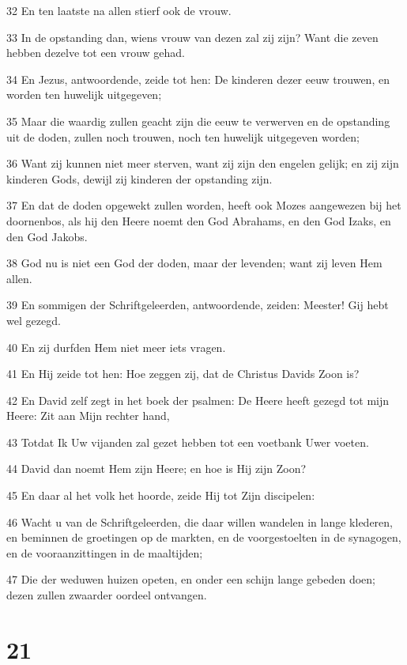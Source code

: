\par 32 En ten laatste na allen stierf ook de vrouw.
\par 33 In de opstanding dan, wiens vrouw van dezen zal zij zijn? Want die zeven hebben dezelve tot een vrouw gehad.
\par 34 En Jezus, antwoordende, zeide tot hen: De kinderen dezer eeuw trouwen, en worden ten huwelijk uitgegeven;
\par 35 Maar die waardig zullen geacht zijn die eeuw te verwerven en de opstanding uit de doden, zullen noch trouwen, noch ten huwelijk uitgegeven worden;
\par 36 Want zij kunnen niet meer sterven, want zij zijn den engelen gelijk; en zij zijn kinderen Gods, dewijl zij kinderen der opstanding zijn.
\par 37 En dat de doden opgewekt zullen worden, heeft ook Mozes aangewezen bij het doornenbos, als hij den Heere noemt den God Abrahams, en den God Izaks, en den God Jakobs.
\par 38 God nu is niet een God der doden, maar der levenden; want zij leven Hem allen.
\par 39 En sommigen der Schriftgeleerden, antwoordende, zeiden: Meester! Gij hebt wel gezegd.
\par 40 En zij durfden Hem niet meer iets vragen.
\par 41 En Hij zeide tot hen: Hoe zeggen zij, dat de Christus Davids Zoon is?
\par 42 En David zelf zegt in het boek der psalmen: De Heere heeft gezegd tot mijn Heere: Zit aan Mijn rechter hand,
\par 43 Totdat Ik Uw vijanden zal gezet hebben tot een voetbank Uwer voeten.
\par 44 David dan noemt Hem zijn Heere; en hoe is Hij zijn Zoon?
\par 45 En daar al het volk het hoorde, zeide Hij tot Zijn discipelen:
\par 46 Wacht u van de Schriftgeleerden, die daar willen wandelen in lange klederen, en beminnen de groetingen op de markten, en de voorgestoelten in de synagogen, en de vooraanzittingen in de maaltijden;
\par 47 Die der weduwen huizen opeten, en onder een schijn lange gebeden doen; dezen zullen zwaarder oordeel ontvangen.

\chapter{21}

